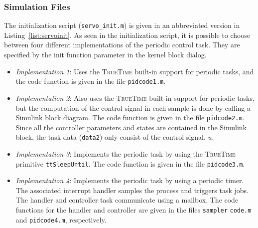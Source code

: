 \documentclass[final,twoside]{rapport}
\begin{document}
\subsubsection{Simulation Files}

The initialization script (\texttt{servo\_init.m}) is given in an
abbreviated version in Listing~\ref{list:servoinit}. As seen in the
initialization script, it is possible to choose between four different
implementations of the periodic control task. They are specified by
the init function parameter in the kernel block dialog.

\begin{itemize}
\item \textit{Implementation 1}: Uses the \textsc{TrueTime}
  built-in support for periodic tasks, and the code function is given
  in the file \texttt{pidcode1.m}.
\item \textit{Implementation 2}: Also uses the \textsc{TrueTime}
  built-in support for periodic tasks, but the computation of the
  control signal in each sample is done by calling a Simulink block
  diagram. The code function is given in the file
  \texttt{pidcode2.m}. Since all the controller parameters and states
  are contained in the Simulink block, the task data (\texttt{data2})
  only consist of the control signal, $u$.
\item \textit{Implementation 3}: Implements the periodic task by
  using the \textsc{TrueTime} primitive \texttt{ttSleepUntil}. The
  code function is given in the file \texttt{pidcode3.m}.
\item \textit{Implementation 4}: Implements the periodic task by using
  a periodic timer. The associated interrupt handler samples the
  process and triggers task jobs. The handler and controller task
  communicate using a mailbox. The code functions for the handler and
  controller are given in the files \texttt{sampler} \texttt{code.m} and
  \texttt{pidcode4.m}, respectively.
\end{itemize}
\end{document}
